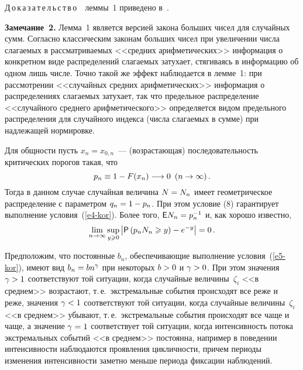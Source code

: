 \begin{multicols}{2}
\smallskip

\noindent
Д\,о\,к\,а\,з\,а\,т\,е\,л\,ь\,с\,т\,в\,о\ \ леммы~1 приведено в~\cite{Korolev1994}.

\smallskip

\noindent
\textbf{Замечание~2.} Лемма~1 является версией закона больших чисел для
случайных сумм. Согласно классическим законам больших чисел при
увеличении числа слагаемых в рассматриваемых <<средних
арифметических>> информация о конкретном виде распределений
слагаемых затухает, стягиваясь в информацию об одном лишь числе.
Точно такой же эффект наблюдается в лемме~1: при рас\-смот\-ре\-нии
<<случайных средних арифметических>> информация о распределениях
слагаемых затухает, так что предельное распределение <<случайного
среднего арифметического>> определяется видом предельного
распределения для случайного индекса (числа слагаемых в сумме) при
надлежащей нормировке.

\smallskip

Для общности пусть $x_n=x_{0,n}$~--- (возрас\-та\-ющая)
последовательность критических порогов такая, что
\begin{equation}
p_n\equiv 1-F(x_n)\longrightarrow 0 \enskip (n\to\infty)\,.\label{e8-kor}
\end{equation}
Тогда в данном случае случайная величина $N\hm=N_n$ имеет
геометрическое распределение с параметром $q_n\hm=1\hm-p_n$. При этом
условие (8) гарантирует выполнение условия~(\ref{e4-kor}). Более того, 
${\sf E}N_n\hm=p_n^{-1}$ и, как хорошо известно,
\begin{equation*}
\lim\limits_{n\to\infty}\sup\limits_{y\geqslant0}\left\vert{\sf P}\left(p_nN_n\geqslant
y\right)-e^{-y}\right\vert =0\,. %
\end{equation*}

Предположим, что постоянные $b_n$, обеспечивающие выполнение условия~(\ref{e5-kor}), 
имеют вид $b_n\hm=bn^{\gamma}$ при некоторых $b\hm>0$ и $\gamma\hm>0$.
При этом значения $\gamma\hm>1$ соответствуют той ситуации, когда
случайные величины~$\zeta_i$ <<в среднем>> возрастают, т.\,е.\
экстремальные события происходят все реже и реже, значения
$\gamma\hm<1$ соответствуют той ситуации, когда случайные величины~$\zeta_i$ 
<<в среднем>> убывают, т.\,е.\ экстремальные события
происходят все чаще и чаще, а значение $\gamma\hm=1$ соответствует той
ситуации, когда интенсивность потока экстремальных событий <<в
среднем>> постоянна, например в поведении интенсивности наблюдаются
проявления цикличности, причем периоды изменения интенсивности
заметно меньше периода фиксации наблюдений.


\end{multicols}
